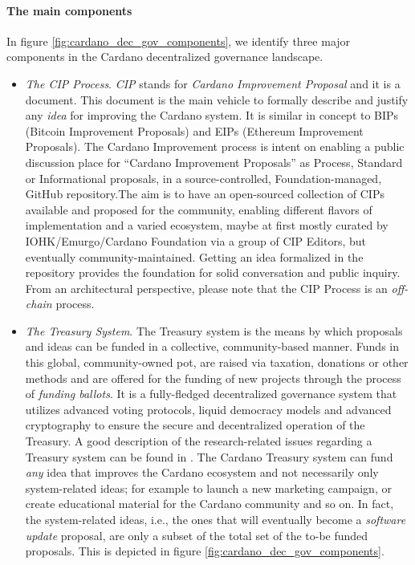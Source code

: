 \paragraph{The main components}
In figure \ref{fig:cardano_dec_gov_components}, we identify three major 
components in the Cardano decentralized governance landscape.
\begin{itemize}
	\item \emph{The CIP Process}. \emph{CIP} stands for \emph{Cardano 
		Improvement Proposal} and it is a document. This document is the main 
	vehicle to formally describe and justify any \emph{idea} for improving the 
	Cardano system. It is similar in concept to BIPs (Bitcoin Improvement 
	Proposals)  and EIPs (Ethereum Improvement Proposals). The Cardano 
	Improvement process is intent on enabling a public discussion place for 
	``Cardano Improvement Proposals'' as Process, Standard or Informational 
	proposals, in a source-controlled, Foundation-managed, GitHub 
	repository.The aim is to have an open-sourced collection of CIPs available 
	and proposed for the community, enabling different flavors of 
	implementation and a varied ecosystem, maybe at first mostly curated by 
	IOHK/Emurgo/Cardano Foundation via a group of CIP Editors, but eventually 
	community-maintained. Getting an idea formalized in the repository provides 
	the foundation for solid conversation and public inquiry. From an 
	architectural perspective, please note that the CIP Process is an 
	\emph{off-chain} process.
	
	\item \emph{The Treasury System}. The Treasury system is the means by 
	which proposals and ideas can be funded in a collective, community-based 
	manner. Funds in this global, community-owned pot, are raised via taxation, 
	donations or other methods and are offered for the funding of new projects 
	through the process of \emph{funding ballots}. It is a fully-fledged 
	decentralized 
	governance system that utilizes advanced voting protocols, liquid democracy 
	models and advanced cryptography to ensure the secure and decentralized 
	operation of the Treasury. A good description of the research-related 
	issues regarding a Treasury system can be found in 
	\cite{treasury}. The Cardano Treasury system can 
	fund \emph{any} idea that improves the Cardano ecosystem and not 
	necessarily only system-related ideas; for example to launch a new 
	marketing campaign, or create educational material for the Cardano 
	community and so on. In fact, the system-related ideas, 
	i.e., the ones that will eventually become a \emph{software update} 
	proposal, are only a subset of the total set of the to-be funded proposals. 
	This is depicted in figure \ref{fig:cardano_dec_gov_components}.
	

\end{itemize}
